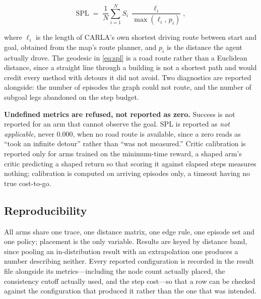 \begin{equation}
\label{eq:spl}
  \mathrm{SPL} \;=\; \frac{1}{N}\sum_{i=1}^{N}
  S_i \,\frac{\ell_i}{\max(\ell_i,\, p_i)},
\end{equation}

where $\ell_i$ is the length of CARLA's own shortest driving route between start
and goal, obtained from the map's route planner, and $p_i$ is the distance the
agent actually drove. The geodesic in \eqref{eq:spl} is a road route rather than
a Euclidean distance, since a straight line through a building is not a shortest
path and would credit every method with detours it did not avoid. Two
diagnostics are reported alongside: the number of episodes the graph could not
route, and the number of subgoal legs abandoned on the step budget.

\textbf{Undefined metrics are refused, not reported as zero.} Success is not
reported for an arm that cannot observe the goal. SPL is reported as \emph{not
applicable}, never \num{0.000}, when no road route is available, since a zero
reads as ``took an infinite detour'' rather than ``was not measured.'' Critic
calibration is reported only for arms trained on the minimum-time reward, a
shaped arm's critic predicting a shaped return so that scoring it against
elapsed steps measures nothing; calibration is computed on arriving episodes
only, a timeout having no true cost-to-go.

\subsection{Reproducibility}
\label{sec:setup:repro}

All arms share one trace, one distance matrix, one edge rule, one episode set
and one policy; placement is the only variable. Results are keyed by distance
band, since pooling an in-distribution result with an extrapolation one produces
a number describing neither. Every reported configuration is recorded in the
result file alongside its metrics---including the node count actually placed,
the consistency cutoff actually used, and the step cost---so that a row can be
checked against the configuration that produced it rather than the one that was
intended.
